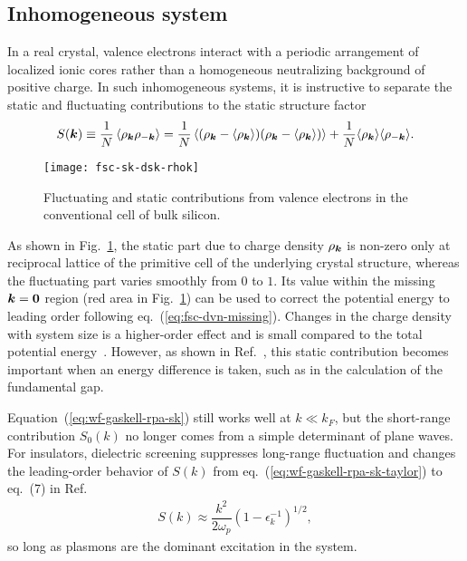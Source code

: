 \subsection{Inhomogeneous system}
In a real crystal, valence electrons interact with a periodic arrangement of localized ionic cores rather than a homogeneous neutralizing background of positive charge.
In such inhomogeneous systems, it is instructive to separate the static and fluctuating contributions to the static structure factor
\begin{align}
S(\boldsymbol{k}) \equiv \frac{1}{N}\left\langle
\rho_{\boldsymbol{k}}\rho_{-\boldsymbol{k}}
\right\rangle =
\frac{1}{N}\left\langle
(\rho_{\boldsymbol{k}}-\langle\rho_{\boldsymbol{k}}\rangle)(\rho_{\boldsymbol{k}}-\langle\rho_{\boldsymbol{k}}\rangle)
\right\rangle + \frac{1}{N}
\langle\rho_{\boldsymbol{k}}\rangle\langle\rho_{-\boldsymbol{k}}\rangle.
\end{align}
\begin{figure}[h]
\texttt{[image: fsc-sk-dsk-rhok]}
\caption{Fluctuating and static contributions from valence electrons in the conventional cell of bulk silicon.}
\label{fig:fsc-sk-dsk-rhok}
\end{figure}
As shown in Fig.~\ref{fig:fsc-sk-dsk-rhok}, the static part due to charge density $\rho_{\boldsymbol{k}}$ is non-zero only at reciprocal lattice of the primitive cell of the underlying crystal structure, whereas the fluctuating part varies smoothly from $0$ to $1$. Its value within the missing $\boldsymbol{k}=\boldsymbol{0}$ region (red area in Fig.~\ref{fig:fsc-sk-dsk-rhok}) can be used to correct the potential energy to leading order following eq.~(\ref{eq:fsc-dvn-missing}).
Changes in the charge density with system size is a higher-order effect and is small compared to the total potential energy~\cite{Clay2016}. However, as shown in Ref.~\cite{Yang2020-gap}, this static contribution becomes important when an energy difference is taken, such as in the calculation of the fundamental gap.

Equation~(\ref{eq:wf-gaskell-rpa-sk}) still works well at $k\ll k_F$, but the short-range contribution $S_0(k)$ no longer comes from a simple determinant of plane waves. For insulators, dielectric screening suppresses long-range fluctuation and changes the leading-order behavior of $S(k)$ from eq.~(\ref{eq:wf-gaskell-rpa-sk-taylor}) to eq.~(7) in Ref.~\cite{Yang2020-gap}
\begin{align}
S(k) \approx \dfrac{k^2}{2\omega_p}(1-\epsilon_k^{-1})^{1/2},
\end{align}
so long as plasmons are the dominant excitation in the system.

